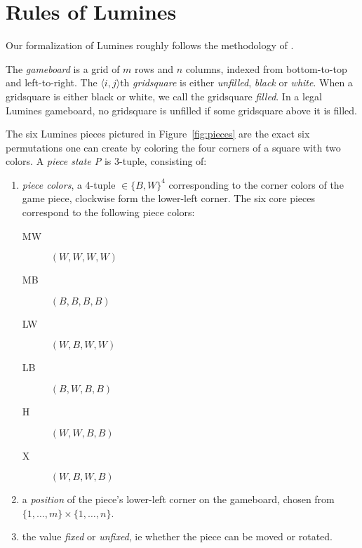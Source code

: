 \section{Rules of Lumines}
Our formalization of Lumines roughly follows the methodology of \citeauthor{tetris} \cite{tetris}.

\begin{description}[style=unboxed, leftmargin=0cm,labelsep=1em]
    \item[The gameboard] The \emph{gameboard} is a grid of $m$ rows and $n$ columns, indexed from bottom-to-top and left-to-right. The $\langle i,j \rangle$th \emph{gridsquare} is either \emph{unfilled}, \emph{black} or \emph{white}. When a gridsquare is either black or white, we call the gridsquare \emph{filled}. In a legal Lumines gameboard, no gridsquare is unfilled if some gridsquare above it is filled.

    \item[Game pieces] The six Lumines pieces pictured in Figure~\ref{fig:pieces} are the exact six permutations one can create by coloring the four corners of a square with two colors. A \emph{piece state P} is 3-tuple, consisting of: 

    \begin{enumerate}
        \item \emph{piece colors}, a 4-tuple $\in \{B,W\}^4$ corresponding to the corner colors of the game piece, clockwise form the lower-left corner. The six core pieces correspond to the following piece colors:

        \begin{description}
            \item[MW] $(W,W,W,W)$
            \item[MB] $(B,B,B,B)$
            \item[LW] $(W,B,W,W)$
            \item[LB] $(B,W,B,B)$
            \item[H] $(W,W,B,B)$
            \item[X] $(W,B,W,B)$
        \end{description}

        \item a \emph{position} of the piece's lower-left corner on the gameboard, chosen from $\{1, \ldots, m\} \times \{1, \ldots, n\}$.
        \item the value \emph{fixed} or \emph{unfixed}, ie whether the piece can be moved or rotated.
    \end{enumerate}


\end{description}
